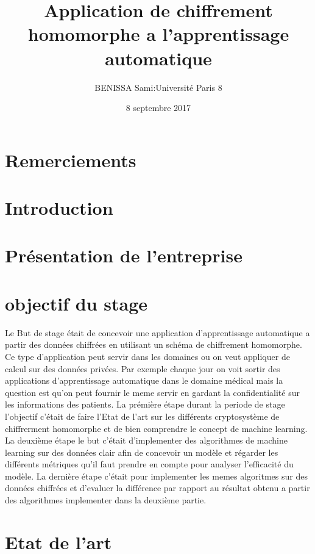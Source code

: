 \documentclass[a4paper,11pt]{report}
\title{Application de chiffrement homomorphe a l'apprentissage automatique}
\author{BENISSA Sami\quad:\quad Université Paris 8}
\date{8 septembre 2017}
\begin{document}
\maketitle
\section{Remerciements}
\newpage
\section{Introduction}
\newpage
\section{Présentation de l’entreprise}
\newpage
\newpage

\section{objectif du stage}
Le But de  stage était de concevoir une application d'apprentissage automatique a partir des données chiffrées en utilisant un schéma de chiffrement homomorphe.\newline
Ce type d'application peut servir dans les domaines ou on veut appliquer de calcul sur des données privées.\newline
Par exemple chaque jour on voit sortir des applications d'apprentissage automatique dans le domaine médical mais la question est qu'on peut fournir le meme servir en gardant la confidentialité sur les informations des patients.\newline
La prémière étape durant la periode de stage l'objectif c'était de faire l'Etat de l'art sur les différents cryptosystème de chiffrerment homomorphe et de bien comprendre le concept de machine learning.\newline
La deuxième étape le but c'était d'implementer des algorithmes de machine learning sur des données clair afin de concevoir un modèle et régarder les différents métriques qu'il faut prendre en compte pour analyser l'efficacité du modèle.\newline
La dernière étape c'était pour implementer les memes algoritmes sur des données chiffrées et d'evaluer la différence par rapport au résultat obtenu a partir des algorithmes implementer dans la deuxième partie.\newline
\section{Etat de l'art} 
\end{document}
